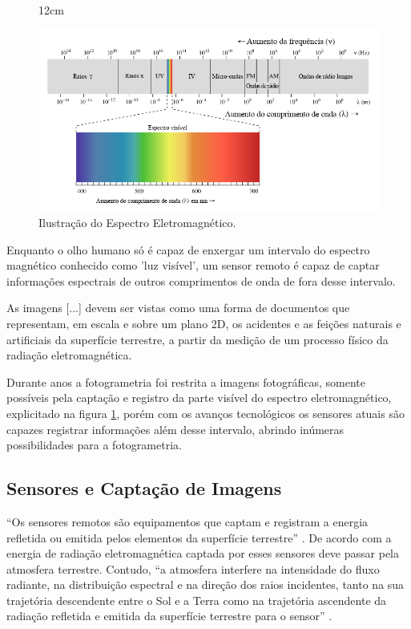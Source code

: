 \begin{figure}[!ht]{12cm}
  \caption{Ilustração do Espectro Eletromagnético.} \label{espectro}
  \includegraphics[width=1.1\hsize]{figuras/espectro.png}
\end{figure}

Enquanto o olho humano só é capaz de enxergar um intervalo do espectro magnético conhecido como 'luz visível', um sensor remoto é capaz de captar informações espectrais de outros comprimentos de onda de fora desse intervalo. 
\begin{citacao}
    
As imagens [...] devem ser vistas como uma forma de documentos que representam, em escala e sobre um plano 2D, os acidentes e as feições naturais e artificiais da superfície terrestre, a partir da medição de um processo físico da radiação eletromagnética.\cite[p.77]{meneses2012introduccao}
\end{citacao}
Durante anos a fotogrametria foi restrita a imagens fotográficas, somente possíveis pela captação e registro da parte visível do espectro eletromagnético, explicitado na figura \ref{espectro}, porém com os avanços tecnológicos os sensores atuais são capazes registrar informações além desse intervalo, abrindo inúmeras possibilidades para a fotogrametria.  

\subsection{Sensores e Captação de Imagens}\label{sensor_img}
``Os sensores remotos são equipamentos que captam e registram a energia refletida ou emitida pelos elementos da superfície terrestre'' \cite{florenzano2007iniciaccao}.
De acordo com  a energia de radiação eletromagnética captada por esses sensores deve passar pela atmosfera terrestre.
Contudo, ``a atmosfera interfere na intensidade do fluxo radiante, na distribuição espectral e na direção dos raios incidentes, tanto na sua trajetória
descendente entre o Sol e a Terra como na trajetória ascendente da radiação refletida e
emitida da superfície terrestre para o sensor'' \cite[p.24]{meneses2012introduccao}.

